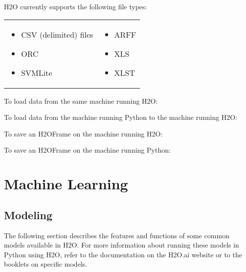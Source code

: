 { H2O currently supports the following file types:

\begin{frame}%

\begin{tabular}{p{5.5cm}p{5.5cm}}

\begin{itemize}
\item CSV (delimited) files
\item ORC
\item SVMLite
\end{itemize} &

\begin{itemize}
\item ARFF
\item XLS
\item XLST 
\end{itemize}

\end{tabular}
\end{frame}


To load data from the same machine running H2O:


To load data from the machine running Python to the machine running H2O:


To save an H2OFrame on the machine running H2O:


To save an H2OFrame on the machine running Python:


\newpage
\section{Machine Learning}

\subsection{Modeling}
The following section describes the features and functions of some common models available in H2O.  For more information about running these models in Python using H2O, refer to the documentation on
the H2O.ai website or to the booklets on specific models.


}
